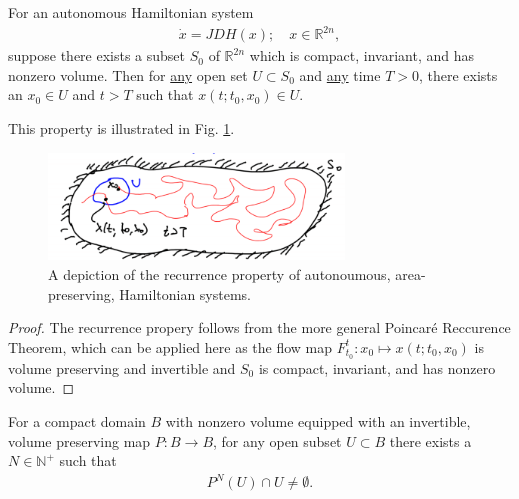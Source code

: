 \begin{proposition}[Recurrence]
	For an autonomous Hamiltonian system
	\begin{align}
		\dot{x}= JDH(x);\quad x \in \mathbb{R}^{2n},
	\end{align}
	suppose there exists a subset $S_0$ of $\mathbb{R}^{2n}$ which is compact, invariant, and has nonzero volume. Then for \underline{any} open set $U\subset S_0$ and \underline{any} time $T>0$, there exists an $x_0 \in U$ and $t>T$ such that $x(t;t_0, x_0)\in U$.	
\end{proposition}
This property is illustrated in Fig. \ref{fig:hamiltonian_recurrence}.
\begin{figure}[h!]
	\centering
	\includegraphics[width=0.7\textwidth]{figures/ch8/11hamiltonian_recurrence.png}
	\caption{A depiction of the recurrence property of autonoumous, area-preserving, Hamiltonian systems.}
	\label{fig:hamiltonian_recurrence}
\end{figure}
\begin{proof}
	The recurrence propery follows from the more general Poincaré Reccurence Theorem, which can be applied here as the flow map $F_{t_0}^{t}:x_0 \mapsto x(t;t_0, x_0)$ is volume preserving and invertible and $S_0$ is compact, invariant, and has nonzero volume.
\end{proof}
\begin{proposition}
	For a compact domain $B$ with nonzero volume equipped with an invertible, volume preserving map $P:B\to B$, for any open subset $U\subset B$ there exists a $N \in \mathbb{N}^{+}$ such that
	\begin{align}
		\boxed{P^{N}(U) \cap U \neq \emptyset.}
	\end{align}
\end{proposition}
